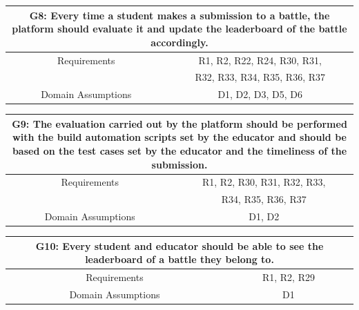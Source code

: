 \documentclass{article}
\begin{document}
\begin{table}[H]
    \centering
    \begin{tabular*}{\linewidth}{@{\extracolsep{\fill}} cc }
        \hline
        \multicolumn{2}{|c|}{\parbox{0.9\dimexpr\textwidth-2\tabcolsep\relax}{\centering\textbf{G8: Every time a student makes a submission to a battle, the platform should evaluate it and update the leaderboard of the battle accordingly.}}} \\
        \hline
        Requirements & R1, R2, R22, R24, R30, R31,\\
                     & R32, R33, R34, R35, R36, R37\\
        \hline
        Domain Assumptions & D1, D2, D3, D5, D6\\
        \hline
    \end{tabular*}
\end{table}

\begin{table}[H]
    \centering
    \begin{tabular*}{\linewidth}{@{\extracolsep{\fill}} cc }
        \hline
        \multicolumn{2}{|c|}{\parbox{0.9\dimexpr\textwidth-2\tabcolsep\relax}{\centering\textbf{G9: The evaluation carried out by the platform should be performed with the build automation scripts set by the educator and should be based on the test cases set by the educator and the timeliness of the submission.}}} \\
        \hline
        Requirements & R1, R2, R30, R31, R32, R33,\\
                     & R34, R35, R36, R37\\
        \hline
        Domain Assumptions & D1, D2\\
        \hline
    \end{tabular*}
\end{table}

\begin{table}[H]
    \centering
    \begin{tabular*}{\linewidth}{@{\extracolsep{\fill}} cc }
        \hline
        \multicolumn{2}{|c|}{\parbox{0.9\dimexpr\textwidth-2\tabcolsep\relax}{\centering\textbf{G10: Every student and educator should be able to see the leaderboard of a battle they belong to.}}} \\
        \hline
        Requirements & R1, R2, R29\\
        \hline
        Domain Assumptions & D1\\
        \hline
    \end{tabular*}
\end{table}
\end{document}
